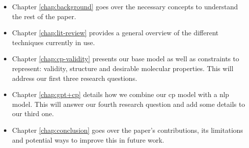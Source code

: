 \documentclass[../Document.tex]{subfiles}
\begin{document}
\begin{itemize}
    \item Chapter \ref{chap:background} goes over the necessary concepts to understand the rest of the paper.
    \item Chapter \ref{chap:lit-review} provides a general overview of the different techniques currently in use.
    \item Chapter \ref{chap:cp-validity} presents our base \cp model as well as constraints to represent: validity, structure and desirable molecular properties. This will address our first three research questions.
    \item Chapter \ref{chap:gpt+cp} details how we combine our \acrshort{cp} model with a \acrshort{nlp} model. This will answer our fourth research question and add some details to our third one.
    \item Chapter \ref{chap:conclusion} goes over the paper's contributions, its limitations and potential ways to improve this in future work.
\end{itemize}
\end{document}
